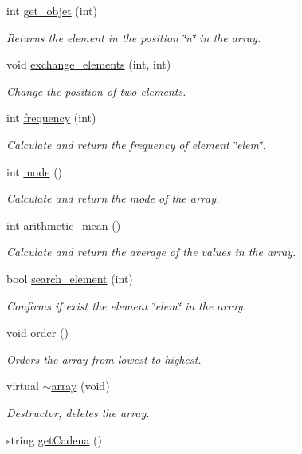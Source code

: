 \begin{DoxyCompactItemize}
int \hyperlink{classarray_a427fb838f6e374a9ea4ef0e7b44d93dd}{get\-\_\-objet} (int)
\begin{DoxyCompactList}\small\item\em Returns the element in the position \char`\"{}n\char`\"{} in the array. \end{DoxyCompactList}\item 
void \hyperlink{classarray_a22cde0113cdefb2a6d94e1f80e266995}{exchange\-\_\-elements} (int, int)
\begin{DoxyCompactList}\small\item\em Change the position of two elements. \end{DoxyCompactList}\item 
int \hyperlink{classarray_afe6a8d768c570a02b57263abcbe6a65e}{frequency} (int)
\begin{DoxyCompactList}\small\item\em Calculate and return the frequency of element \char`\"{}elem\char`\"{}. \end{DoxyCompactList}\item 
int \hyperlink{classarray_a706787bc95f2933241e6f5ba1635e78c}{mode} ()
\begin{DoxyCompactList}\small\item\em Calculate and return the mode of the array. \end{DoxyCompactList}\item 
int \hyperlink{classarray_a2a261ef6223d7a7ec17881b97c36f8b6}{arithmetic\-\_\-mean} ()
\begin{DoxyCompactList}\small\item\em Calculate and return the average of the values in the array. \end{DoxyCompactList}\item 
bool \hyperlink{classarray_a411982e015049087a459f6ae39b6114b}{search\-\_\-element} (int)
\begin{DoxyCompactList}\small\item\em Confirms if exist the element \char`\"{}elem\char`\"{} in the array. \end{DoxyCompactList}\item 
void \hyperlink{classarray_a38e384e7d7ad83f194639013cf7eb7fd}{order} ()
\begin{DoxyCompactList}\small\item\em Orders the array from lowest to highest. \end{DoxyCompactList}\item 
virtual \hyperlink{classarray_a9650b46e4d802e77a89ec65e248c523e}{$\sim$array} (void)
\begin{DoxyCompactList}\small\item\em Destructor, deletes the array. \end{DoxyCompactList}\item 
string \hyperlink{classarray_ac4088f8ff54a0a4e016ac66b900c976a}{get\-Cadena} ()
\end{DoxyCompactItemize}
